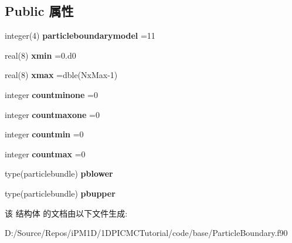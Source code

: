 \subsection*{Public 属性}
\begin{DoxyCompactItemize}
\item 
\mbox{\label{structmoduleparticleboundary_1_1particleboundaryone_ad3a7b0d0985310ac785a291e6e0cabee}} 
integer(4) {\bfseries particleboundarymodel} =11
\item 
\mbox{\label{structmoduleparticleboundary_1_1particleboundaryone_a4fddf31924dd3a746bbdb2286bde7809}} 
real(8) {\bfseries xmin} =0.d0
\item 
\mbox{\label{structmoduleparticleboundary_1_1particleboundaryone_a284b40fd7831c6e5221d49b19f4e1f10}} 
real(8) {\bfseries xmax} =dble(Nx\+Max-\/1)
\item 
\mbox{\label{structmoduleparticleboundary_1_1particleboundaryone_a40fd0dcbe0a14f94ee600820c9f9e97c}} 
integer {\bfseries countminone} =0
\item 
\mbox{\label{structmoduleparticleboundary_1_1particleboundaryone_ae24ae57f39e843ad3d266c390ecd09aa}} 
integer {\bfseries countmaxone} =0
\item 
\mbox{\label{structmoduleparticleboundary_1_1particleboundaryone_a2e1ca262209c3e7c2ff324f903cf6f4b}} 
integer {\bfseries countmin} =0
\item 
\mbox{\label{structmoduleparticleboundary_1_1particleboundaryone_ade974117272b03e1737aef57adf540d2}} 
integer {\bfseries countmax} =0
\item 
\mbox{\label{structmoduleparticleboundary_1_1particleboundaryone_a09adb069cd94a9b332cfec2f0c02f336}} 
type(particlebundle) {\bfseries pblower}
\item 
\mbox{\label{structmoduleparticleboundary_1_1particleboundaryone_a510f9a8685bac9c9700308831ab852e7}} 
type(particlebundle) {\bfseries pbupper}
\end{DoxyCompactItemize}


该 结构体 的文档由以下文件生成\+:\begin{DoxyCompactItemize}
\item 
D\+:/\+Source/\+Repos/i\+P\+M1\+D/1\+D\+P\+I\+C\+M\+C\+Tutorial/code/base/Particle\+Boundary.\+f90\end{DoxyCompactItemize}
